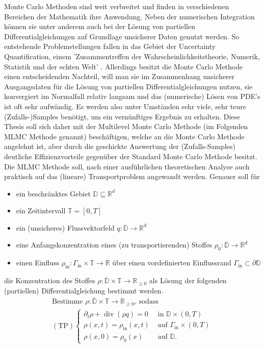 \documentclass[12pt,a4paper]{scrartcl}
\numberwithin{equation}{section}
\newcommand{\R}{\mathbb{R}} %
\DeclareMathOperator{\dive}{div}
\begin{document}
Monte Carlo Methoden sind weit verbreitet und finden in verschiedenen Bereichen der Mathematik ihre Anwendung.
Neben der numerischen Integration können sie unter anderem auch bei der Lösung von partiellen Differentialgleichungen auf Grundlage unsicherer Daten genutzt werden.
So entstehende Problemstellungen fallen in das Gebiet der Uncertainty Quantification, einem 'Zusammentreffen der Wahrscheinlichkeitstheorie, Numerik, Statistik und der echten Welt' \cite{sullivan2015introduction}.
Allerdings besitzt die Monte Carlo Methode einen entscheidenden Nachteil, will man sie im Zusammenhang unsicherer Ausgangsdaten für die Lösung von partiellen Differentialgleichungen nutzen, sie konvergiert im Normalfall relativ langsam und das (numerische) Lösen von PDE's ist oft sehr aufwändig.
Es werden also unter Umständen sehr viele, sehr teure (Zufalls-)Samples benötigt, um ein vernünftiges Ergebnis zu erhalten. \newline
Diese Thesis soll sich daher mit der Multilevel Monte Carlo Methode (im Folgenden MLMC Methode genannt) beschäftigen, welche an die Monte Carlo Methode angelehnt ist, aber durch die geschickte Auswertung der (Zufalls-Samples) deutliche Effizienzvorteile gegenüber der Standard Monte Carlo Methode besitzt.
Die MLMC Methode soll, nach einer ausführlichen theoretischen Analyse auch praktisch auf das (lineare) Transportproblem angewandt werden.
Genauer soll für
\begin{itemize}
	\item ein beschränktes Gebiet $\mathbb{D} \subseteq \R^d$
	\item  ein Zeitintervall $\mathbb{T} = [0,T]$
	\item  ein (unsicheres) Flussvektorfeld $q: \overline{\mathbb{D}} \rightarrow \R^d$
	\item  eine Anfangskonzentration eines (zu transportierenden) Stoffes $\rho_0: \overline{\mathbb{D}} \rightarrow \R^d$
	\item einen Einfluss $\rho_{\text{in}} : \Gamma_{\text{in}} \times \mathbb{T} \rightarrow \R$ über einen vordefinierten Einflussrand $\Gamma_{\text{in}} \subset  \partial \mathbb{D}$
\end{itemize}
    die Konzentration des Stoffes $\rho: \overline{\mathbb{D}} \times \mathbb{T}  \rightarrow \R_{\geq0}$ als Lösung der folgenden (partiellen) Differentialgleichung bestimmt werden.
\begin{gather*}
\text{Bestimme } \rho: \overline{\mathbb{D}} \times \mathbb{T} \to \R_{\geq 0} \text{, sodass}\\
(\text{TP})
\begin{cases}
\partial_t \rho + \dive(\rho q) = 0 &\text{ in } \mathbb{D} \times (0,T)\\
\rho(x,t) = \rho_{\text{in}}(x,t) &\text{ auf } \Gamma_{\text{in}} \times (0,T)\\
\rho(x,0) = \rho_0(x) &\text{ auf } \mathbb{D}.
\end{cases}
\end{gather*}
\end{document}
